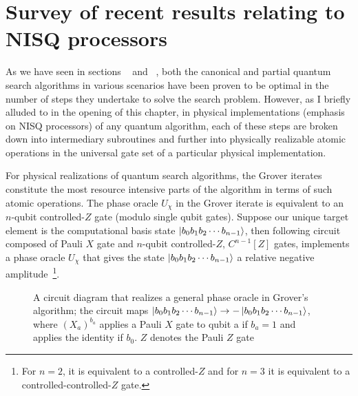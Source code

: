 \section{Survey of recent results relating to NISQ processors}
As we have seen in sections ~ and ~, both the canonical and partial quantum search algorithms in various scenarios have been proven to be optimal in the number of steps they undertake to solve the search problem. However, as I briefly alluded to in the opening of this chapter, in physical implementations (emphasis on \acs{NISQ} processors) of any quantum algorithm, each of these steps are broken down into intermediary subroutines and further into physically realizable atomic operations in the universal gate set of a particular physical implementation. 

\bigskip
\noindent
For physical realizations of quantum search algorithms, the Grover iterates constitute the most resource intensive parts of the algorithm in terms of such atomic operations. The phase oracle $U_{\chi}$ in the Grover iterate is equivalent to an $n$-qubit controlled-$Z$ gate (modulo single qubit gates). Suppose our unique target element is the computational basis state $\ket{b_0b_1b_2\cdots b_{n-1}}$, then following circuit composed of Pauli $X$ gate and $n$-qubit controlled-$Z$, $C^{n-1}[Z]$ gates, implements a phase oracle $U_{\chi}$ that gives the state $\ket{b_0b_1b_2 \cdots b_{n-1}}$ a relative negative amplitude~\footnote[][-50pt]{For $n=2$, it is equivalent to a controlled-$Z$ and for $n=3$ it is equivalent to a controlled-controlled-$Z$ gate.}.

\begin{figure}[h]
    \centering
    \caption[A circuit diagram that realizes a general phase oracle in Grover's algorithm.]{A circuit diagram that realizes a general phase oracle in Grover's algorithm; the circuit maps ${\ket{b_0b_1b_2 \cdots b_{n-1}} \to -\ket{b_0b_1b_2 \cdots b_{n-1}}}$, where $(X_a)^{b_a}$ applies a Pauli $X$ gate to qubit a if $b_a=1$ and applies the identity if $b_0$. $Z$ denotes the Pauli $Z$ gate}
\end{figure}

